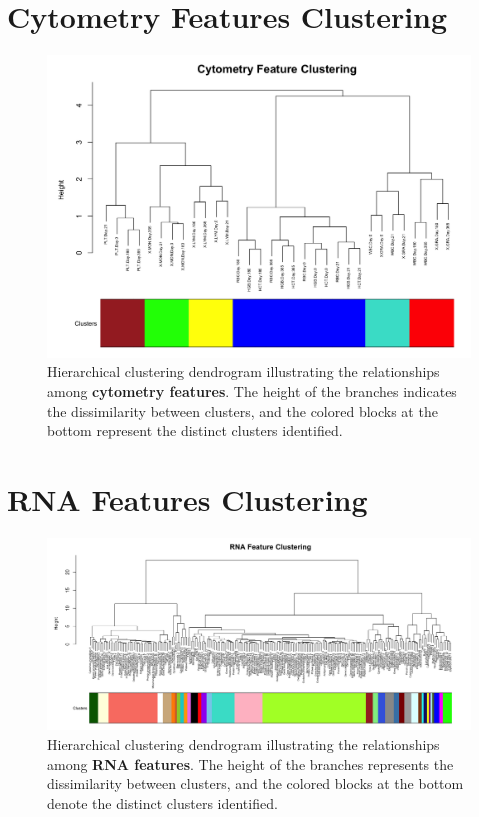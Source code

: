 \documentclass[12pt,a4paper]{report}
\begin{document}
\section{Cytometry Features Clustering}
\begin{figure}[H]
    \centering
    \includegraphics[width=\linewidth]{images/Cytometry_features_clustering_cut_colors.png}
    \caption[Cytometry features clustering dendrogram]{Hierarchical clustering dendrogram illustrating the relationships among \textbf{cytometry features}. The height of the branches indicates the dissimilarity between clusters, and the colored blocks at the bottom represent the distinct clusters identified.}
    \label{fig:Cytometry_features_clustering_cut_colors}
\end{figure}

\section{RNA Features Clustering}
\begin{figure}[h!]
    \centering
    \includegraphics[width=1.4\linewidth, angle=270]{images/RNA_features_clustering_cut_colors.png}
    \caption[RNA features clustering dendrogram]{Hierarchical clustering dendrogram illustrating the relationships among \textbf{RNA features}. The height of the branches represents the dissimilarity between clusters, and the colored blocks at the bottom denote the distinct clusters identified.}
    \label{fig:RNA_features_clustering_cut_colors}
\end{figure}
\end{document}

